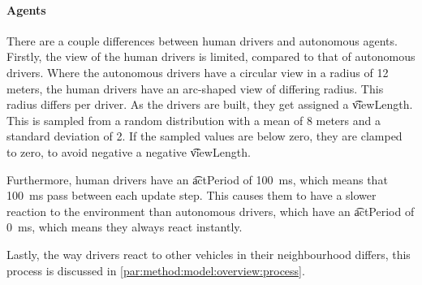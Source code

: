 

\paragraph{Agents}
There are a couple differences between human drivers and autonomous agents. Firstly, the view of the human drivers is limited, compared to that of autonomous drivers. Where the autonomous drivers have a circular view in a radius of 12 meters, the human drivers have an arc-shaped view of differing radius. This radius differs per driver. As the drivers are built, they get assigned a \t{viewLength}. This is sampled from a random distribution with a mean of 8 meters and a standard deviation of 2. If the sampled values are below zero, they are clamped to zero, to avoid negative a negative \t{viewLength}. 

Furthermore, human drivers have an \t{actPeriod} of \SI{100}{\milli\second}, which means that \SI{100}{\milli\second} pass between each update step. This causes them to have a slower reaction to the environment than autonomous drivers, which have an \t{actPeriod} of \SI{0}{\milli\second}, which means they always react instantly. 

Lastly, the way drivers react to other vehicles in their neighbourhood differs, this process is discussed in  \cref{par:method:model:overview:process}. 




